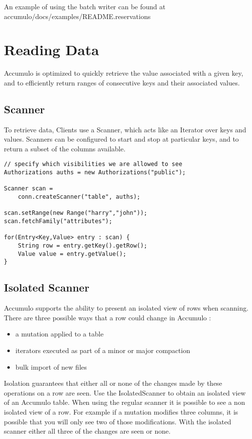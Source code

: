 An example of using the batch writer can be found at\\
accumulo/docs/examples/README.reservations

\section{Reading Data}

Accumulo is optimized to quickly retrieve the value associated with a given key, and
to efficiently return ranges of consecutive keys and their associated values.

\subsection{Scanner}

To retrieve data, Clients use a Scanner, which acts like an Iterator over
keys and values. Scanners can be configured to start and stop at particular keys, and
to return a subset of the columns available.

\begingroup\fontsize{8pt}{8pt}\selectfont\begin{verbatim}
// specify which visibilities we are allowed to see
Authorizations auths = new Authorizations("public");

Scanner scan =
    conn.createScanner("table", auths);

scan.setRange(new Range("harry","john"));
scan.fetchFamily("attributes");

for(Entry<Key,Value> entry : scan) {
    String row = entry.getKey().getRow();
    Value value = entry.getValue();
}
\end{verbatim}\endgroup

\subsection{Isolated Scanner}

Accumulo supports the ability to present an isolated view of rows when
scanning. There are three possible ways that a row could change in Accumulo :

\begin{itemize}
 \item a mutation applied to a table
 \item iterators executed as part of a minor or major compaction
 \item bulk import of new files
\end{itemize}

Isolation guarantees that either all or none of the changes made by these
operations on a row are seen. Use the IsolatedScanner to obtain an isolated
view of an Accumulo table. When using the regular scanner it is possible to see
a non isolated view of a row. For example if a mutation modifies three
columns, it is possible that you will only see two of those modifications.
With the isolated scanner either all three of the changes are seen or none.

